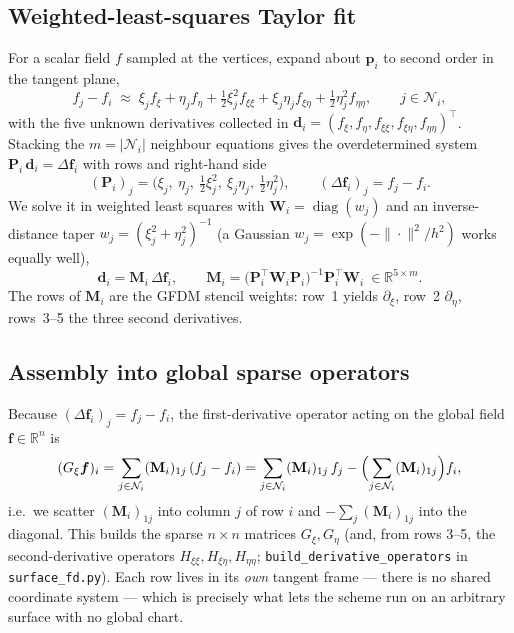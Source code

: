\documentclass[11pt]{article}
\newcommand{\vv}[1]{\bm{#1}}
\begin{document}
\subsection{Weighted-least-squares Taylor fit}
For a scalar field $f$ sampled at the vertices, expand about $\vv p_i$ to second order in the
tangent plane,
\begin{equation}
  f_j-f_i \;\approx\;
  \xi_j f_\xi+\eta_j f_\eta
  +\tfrac12\xi_j^2 f_{\xi\xi}+\xi_j\eta_j f_{\xi\eta}+\tfrac12\eta_j^2 f_{\eta\eta},
  \qquad j\in\mathcal N_i,
  \label{eq:taylor}
\end{equation}
with the five unknown derivatives collected in
$\vv d_i=(f_\xi,f_\eta,f_{\xi\xi},f_{\xi\eta},f_{\eta\eta})^{\!\top}$. Stacking the
$m=|\mathcal N_i|$ neighbour equations gives the overdetermined system
$\mathbf P_i\,\vv d_i=\Delta\vv f_i$ with rows and right-hand side
\begin{equation}
  (\mathbf P_i)_{j}=\bigl(\xi_j,\ \eta_j,\ \tfrac12\xi_j^2,\ \xi_j\eta_j,\ \tfrac12\eta_j^2\bigr),
  \qquad (\Delta\vv f_i)_j=f_j-f_i .
\end{equation}
We solve it in weighted least squares with $\mathbf W_i=\operatorname{diag}(w_j)$ and an
inverse-distance taper $w_j=(\xi_j^2+\eta_j^2)^{-1}$ (a Gaussian
$w_j=\exp(-\|\cdot\|^2/h^2)$ works equally well),
\begin{equation}
  \vv d_i=\mathbf M_i\,\Delta\vv f_i,\qquad
  \mathbf M_i=\bigl(\mathbf P_i^{\!\top}\mathbf W_i\mathbf P_i\bigr)^{-1}\mathbf P_i^{\!\top}\mathbf W_i
  \ \in\mathbb R^{5\times m}.
  \label{eq:wls}
\end{equation}
The rows of $\mathbf M_i$ are the GFDM stencil weights: row~1 yields $\partial_\xi$, row~2
$\partial_\eta$, rows~3--5 the three second derivatives.

\subsection{Assembly into global sparse operators}
Because $(\Delta\vv f_i)_j=f_j-f_i$, the first-derivative operator acting on the global field
$\vv f\in\mathbb R^{n}$ is
\begin{equation}
  (G_\xi\vv f)_i=\sum_{j\in\mathcal N_i}(\mathbf M_i)_{1j}\,(f_j-f_i)
  =\sum_{j\in\mathcal N_i}(\mathbf M_i)_{1j}\,f_j
   -\Bigl(\sum_{j\in\mathcal N_i}(\mathbf M_i)_{1j}\Bigr)f_i ,
\end{equation}
i.e.\ we scatter $(\mathbf M_i)_{1j}$ into column $j$ of row $i$ and
$-\sum_j(\mathbf M_i)_{1j}$ into the diagonal. This builds the sparse $n\times n$ matrices
$G_\xi,G_\eta$ (and, from rows 3--5, the second-derivative operators
$H_{\xi\xi},H_{\xi\eta},H_{\eta\eta}$; \texttt{build\_derivative\_operators} in
\texttt{surface\_fd.py}). Each row lives in its \emph{own} tangent frame --- there is no
shared coordinate system --- which is precisely what lets the scheme run on an arbitrary
surface with no global chart.
\end{document}
